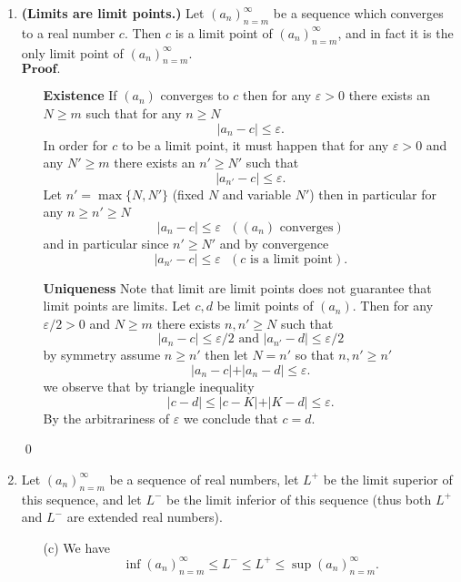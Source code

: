 \documentclass{article}
\theoremstyle{remark}
\begin{document}
\begin{enumerate}
        \item \textbf{(Limits are limit points.)}
        Let \((a_n)_{n=m}^{\infty}\) be a sequence which converges to a real number \(c\). Then \(c\) is a limit point of \((a_n)_{n=m}^{\infty}\), and in fact it is the only limit point of \((a_n)_{n=m}^{\infty}\).
        \\$\textbf{Proof.}$
        \begin{enumerate}
            \item[\textbf{Existence}]
            If $(a_n)$ converges to $c$ then for any $\varepsilon > 0$ there exists an $N \geq m$ such that for any $n \geq N$
            \[
            \vert a_n - c \vert \leq \varepsilon.
            \]
            In order for $c$ to be a limit point, it must happen that for any $\varepsilon > 0$
            and any $N' \geq m$ there exists an $n' \geq N'$ such that
            \[
            \vert a_{n'} - c \vert \leq \varepsilon.
            \]
            Let $n' = \max\{N,N'\}$ (fixed $N$ and variable $N'$) then in particular for any $n \geq n' \geq N$
            \[
            \vert a_n - c \vert \leq \varepsilon \text{ }( (a_n) \text{ converges})
            \]
            and in particular since $n' \geq N'$ and by convergence
            \[
            \vert a_{n'} - c \vert \leq \varepsilon \text{ }( c \text{ is a limit point}).
            \]
            \item[\textbf{Uniqueness}]
            Note that limit are limit points does not guarantee that limit points are limits.
            Let $c,d$ be limit points of $(a_n)$. Then for any $\varepsilon/2 > 0$ and $N \geq m$ there exists $n,n' \geq N$
            such that
            \[
            \vert a_n - c \vert \leq \varepsilon/2 \text{ and } \vert a_{n'} - d\vert \leq \varepsilon/2
            \]
            by symmetry assume $n \geq n'$ then let $N = n'$ so that $n, n' \geq n'$
            \[
            \vert a_n - c \vert + \vert a_{n} - d \vert \leq \varepsilon. 
            \]
            we observe that by triangle inequality
            \[
            \vert c - d \vert \leq \vert c - K\vert + \vert K - d\vert \leq \varepsilon.
            \]
            By the arbitrariness of $\varepsilon$ we conclude that $c = d$.
        \end{enumerate}
        \begin{flushright}
            \qed
        \end{flushright}

        \item Let \( (a_n)_{n=m}^{\infty} \) be a sequence
        of real numbers, let \( L^+ \) be the limit superior of this sequence,
        and let \( L^- \) be the limit inferior of this sequence
        (thus both \( L^+ \) and \( L^- \) are extended real numbers).
        \begin{enumerate}
            \item[(c)] We have 
            \[
                \inf(a_n)_{n=m}^{\infty} \leq L^- \leq L^+ \leq \sup(a_n)_{n=m}^{\infty}.
            \]
        

\end{enumerate}
\end{enumerate}
\end{document}
